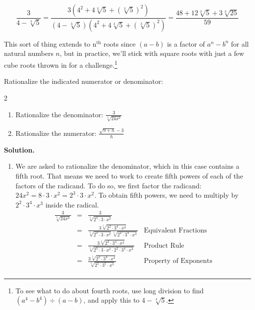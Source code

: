 \documentclass{ximera}
\begin{document}
\[ \frac{3}{4 - \sqrt[3]{5}} = \frac{3(4^2 + 4\sqrt[3]{5} + (\sqrt[3]{5})^2)}{(4 - \sqrt[3]{5})(4^2 + 4\sqrt[3]{5} + (\sqrt[3]{5})^2)} = \frac{48 + 12\sqrt[3]{5}+ 3\sqrt[3]{25}}{59}\]

This sort of thing extends to $\text{n}^{\text{th}}$ roots since $(a-b)$ is a factor of $a^n - b^n$ for all natural numbers $n$, but in practice, we'll stick with square roots with just a few cube roots thrown in for a challenge.\footnote{To see what to do about fourth roots, use long division to find $(a^4 - b^4) \div (a-b)$, and apply this to $4 - \sqrt[4]{5}$.}

\begin{example} \label{rationalizenumdenom} Rationalize the indicated numerator or denominator:

\begin{multicols}{2}
\begin{enumerate}

\item  Rationalize the denominator:  $\frac{3}{\sqrt[5]{24x^2}}$

\item  Rationalize the numerator: $\frac{\sqrt{9 + h} - 3}{h}$

\setcounter{HW}{\value{enumi}}

\end{enumerate}
\end{multicols}

{\bf Solution.}

\begin{enumerate}

\item We are asked to rationalize the denominator, which in this case contains a fifth root.  That means we need to work to create fifth powers of each of the factors of the radicand.  To do so, we first factor the radicand:  $24x^2 = 8 \cdot 3 \cdot x^2 = 2^3 \cdot 3 \cdot x^2$.  To obtain fifth powers, we need to multiply by $2^2 \cdot 3^4 \cdot x^3$ inside the radical.  \[ \begin{array}{rclr}

\frac{3}{\sqrt[5]{24x^2}} & = & \frac{3}{\sqrt[5]{2^3 \cdot 3 \cdot x^2}} & \\  
                           & = & \frac{3 \sqrt[5]{2^2 \cdot 3^4 \cdot x^3}}{\sqrt[5]{2^3 \cdot 3 \cdot x^2}\sqrt[5]{2^2 \cdot 3^4 \cdot x^3}} & \text{Equivalent Fractions} \\ 
												& = & \frac{3 \sqrt[5]{2^2 \cdot 3^4 \cdot x^3}}{\sqrt[5]{2^3 \cdot 3 \cdot x^2 \cdot 2^2 \cdot 3^4 \cdot x^3}} & \text{Product Rule} \\ 
													& = & \frac{3 \sqrt[5]{2^2 \cdot 3^4 \cdot x^3}}{\sqrt[5]{2^5 \cdot 3^5 \cdot x^5}} & \text{Property of Exponents}\\ 
													

\end{array}\]
\end{enumerate}
\end{example}
\end{document}
